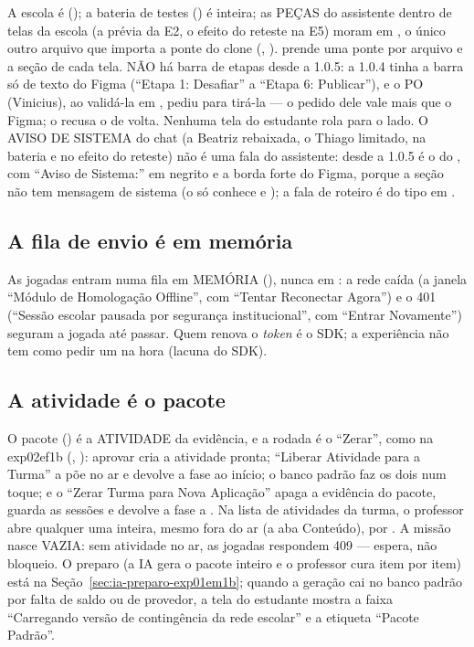 A escola é  (); a bateria de testes
() é  inteira; as PEÇAS do assistente
dentro de telas da escola (a prévia da E2, o efeito do reteste na E5) moram em
, o único outro arquivo que importa a
ponte do clone (, ). 
prende uma ponte por arquivo e a seção de cada tela. NÃO há barra de etapas
desde a 1.0.5: a 1.0.4 tinha a barra só de texto do Figma (\enquote{Etapa 1:
Desafiar} a \enquote{Etapa 6: Publicar}), e o PO (Vinicius), ao validá-la em
, pediu para tirá-la --- o pedido dele vale mais que o Figma; o
 recusa o  de volta. Nenhuma tela do
estudante rola para o lado. O AVISO DE SISTEMA do chat (a Beatriz rebaixada,
o Thiago limitado, na bateria e no efeito do reteste) não é uma fala do
assistente: desde a 1.0.5 é o  do , com
\enquote{Aviso de Sistema:} em negrito e a borda forte do Figma, porque a
seção não tem mensagem de sistema (o  só conhece  e
); a fala de roteiro é do tipo  em
.

\subsection{A fila de envio é em memória}

As jogadas entram numa fila em MEMÓRIA (), nunca em
: a rede caída (a janela \enquote{Módulo de Homologação
Offline}, com \enquote{Tentar Reconectar Agora}) e o 401 (\enquote{Sessão
escolar pausada por segurança institucional}, com \enquote{Entrar Novamente}) seguram a jogada até
passar. Quem renova o \emph{token} é o SDK; a experiência não tem como pedir
um na hora (lacuna do SDK).

\subsection{A atividade é o pacote}

O pacote () é a ATIVIDADE da evidência, e a rodada é
o \enquote{Zerar}, como na exp02ef1b (, ): aprovar
cria a atividade pronta; \enquote{Liberar Atividade para a Turma} a põe no ar
e devolve a fase ao início; o banco padrão faz os dois num toque; e o
\enquote{Zerar Turma para Nova Aplicação} apaga a evidência do pacote,
guarda as sessões e devolve a fase a . Na lista de
atividades da turma, o professor abre qualquer uma inteira, mesmo fora do ar
(a aba Conteúdo), por . A missão nasce
VAZIA: sem atividade no ar, as jogadas respondem 409 
--- espera, não bloqueio. O preparo (a IA gera o pacote inteiro e o professor
cura item por item) está na Seção~\ref{sec:ia-preparo-exp01em1b}; quando a
geração cai no banco padrão por falta de saldo ou de provedor, a tela do
estudante mostra a faixa \enquote{Carregando versão de contingência da rede
escolar} e a etiqueta \enquote{Pacote Padrão}.


